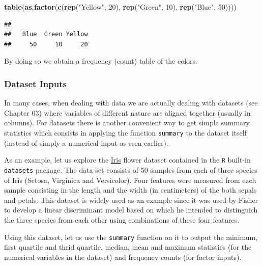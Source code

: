 \documentclass[]{book}
\newenvironment{Shaded}{\begin{snugshade}}{\end{snugshade}}
\newcommand{\KeywordTok}[1]{\textcolor[rgb]{0.13,0.29,0.53}{\textbf{{#1}}}}
\newcommand{\DecValTok}[1]{\textcolor[rgb]{0.00,0.00,0.81}{{#1}}}
\newcommand{\StringTok}[1]{\textcolor[rgb]{0.31,0.60,0.02}{{#1}}}
\newcommand{\NormalTok}[1]{{#1}}
\theoremstyle{definition}
\theoremstyle{definition}
\theoremstyle{remark}
\begin{document}
\begin{Shaded}
\begin{Highlighting}[]
\KeywordTok{table}\NormalTok{(}\KeywordTok{as.factor}\NormalTok{(}\KeywordTok{c}\NormalTok{(}\KeywordTok{rep}\NormalTok{(}\StringTok{"Yellow"}\NormalTok{, }\DecValTok{20}\NormalTok{), }\KeywordTok{rep}\NormalTok{(}\StringTok{"Green"}\NormalTok{, }\DecValTok{10}\NormalTok{), }\KeywordTok{rep}\NormalTok{(}\StringTok{"Blue"}\NormalTok{, }\DecValTok{50}\NormalTok{))))}
\end{Highlighting}
\end{Shaded}

\begin{verbatim}
## 
##   Blue  Green Yellow 
##     50     10     20
\end{verbatim}

By doing so we obtain a frequency (count) table of the colors.

\subsubsection{Dataset Inputs}\label{dataset-inputs}

In many cases, when dealing with data we are actually dealing with
datasets (see Chapter 03) where variables of different nature are
aligned together (usually in columns). For datasets there is another
convenient way to get simple summary statistics which consists in
applying the function \texttt{summary} to the dataset itself (instead of
simply a numerical input as seen earlier).

As an example, let us explore the
\href{https://en.wikipedia.org/wiki/Iris_flower_data_set}{Iris} flower
dataset contained in the \texttt{R} built-in \texttt{datasets} package.
The data set consists of 50 samples from each of three species of Iris
(Setosa, Virginica and Versicolor). Four features were measured from
each sample consisting in the length and the width (in centimeters) of
the both sepals and petals. This dataset is widely used as an example
since it was used by Fisher to develop a linear discriminant model based
on which he intended to distinguish the three species from each other
using combinations of these four features.

Using this dataset, let us use the \texttt{summary} function on it to
output the minimum, first quartile and thrid quartile, median, mean and
maximum statistics (for the numerical variables in the dataset) and
frequency counts (for factor inputs).
\end{document}
